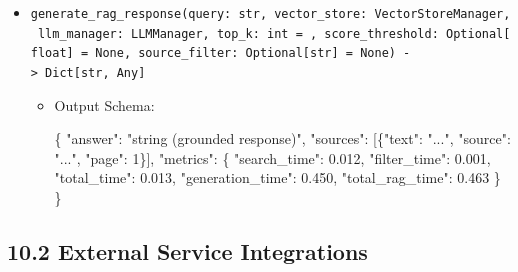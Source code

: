 \documentclass[
]{article}
\newenvironment{Shaded}{}{}
\newcommand{\DataTypeTok}[1]{\textcolor[rgb]{0.56,0.13,0.00}{#1}}
\newcommand{\DecValTok}[1]{\textcolor[rgb]{0.25,0.63,0.44}{#1}}
\newcommand{\FloatTok}[1]{\textcolor[rgb]{0.25,0.63,0.44}{#1}}
\newcommand{\FunctionTok}[1]{\textcolor[rgb]{0.02,0.16,0.49}{#1}}
\newcommand{\OtherTok}[1]{\textcolor[rgb]{0.00,0.44,0.13}{#1}}
\newcommand{\StringTok}[1]{\textcolor[rgb]{0.25,0.44,0.63}{#1}}
\providecommand{\tightlist}{%
  \setlength{\itemsep}{0pt}\setlength{\parskip}{0pt}}
\begin{document}
\begin{itemize}
\tightlist
\item
  \texttt{generate\_\allowbreak rag\_\allowbreak response(\allowbreak query:\ \allowbreak str,\allowbreak \ \allowbreak vector\_\allowbreak store:\ \allowbreak VectorStoreManager,\allowbreak \ \allowbreak llm\_\allowbreak manager:\ \allowbreak LLMManager,\allowbreak \ \allowbreak top\_\allowbreak k:\ \allowbreak int\ \allowbreak =\allowbreak \ ,\allowbreak \ \allowbreak score\_\allowbreak threshold:\ \allowbreak Optional{[}float{]}\ \allowbreak =\allowbreak \ \allowbreak None,\allowbreak \ \allowbreak source\_\allowbreak filter:\ \allowbreak Optional{[}str{]}\ \allowbreak =\allowbreak \ \allowbreak None)\allowbreak \ \allowbreak -\textgreater{}\allowbreak \ \allowbreak Dict{[}str,\allowbreak \ \allowbreak Any{]}}

  \begin{itemize}
  \item
    Output Schema:

\begin{Shaded}
\begin{Highlighting}[]
\FunctionTok{\{}
  \DataTypeTok{"answer"}\FunctionTok{:} \StringTok{"string (grounded response)"}\FunctionTok{,}
  \DataTypeTok{"sources"}\FunctionTok{:} \OtherTok{[}\FunctionTok{\{}\DataTypeTok{"text"}\FunctionTok{:} \StringTok{"..."}\FunctionTok{,} \DataTypeTok{"source"}\FunctionTok{:} \StringTok{"..."}\FunctionTok{,} \DataTypeTok{"page"}\FunctionTok{:} \DecValTok{1}\FunctionTok{\}}\OtherTok{]}\FunctionTok{,}
  \DataTypeTok{"metrics"}\FunctionTok{:} \FunctionTok{\{}
    \DataTypeTok{"search\_time"}\FunctionTok{:} \FloatTok{0.012}\FunctionTok{,}
    \DataTypeTok{"filter\_time"}\FunctionTok{:} \FloatTok{0.001}\FunctionTok{,}
    \DataTypeTok{"total\_time"}\FunctionTok{:} \FloatTok{0.013}\FunctionTok{,}
    \DataTypeTok{"generation\_time"}\FunctionTok{:} \FloatTok{0.450}\FunctionTok{,}
    \DataTypeTok{"total\_rag\_time"}\FunctionTok{:} \FloatTok{0.463}
  \FunctionTok{\}}
\FunctionTok{\}}
\end{Highlighting}
\end{Shaded}
  \end{itemize}
\end{itemize}

\subsection{10.2 External Service
Integrations}\label{external-service-integrations}
\end{document}
